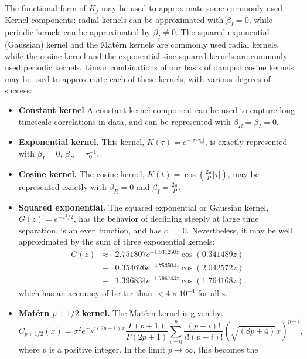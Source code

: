 \documentclass[manuscript, letterpaper]{aastex6}
\begin{document}
The functional form of $K_j$ may be used to approximate some commonly used Kernel components: radial
kernels can be approximated with $\beta_I=0$, while periodic kernels can be approximated by
$\beta_I \ne 0$.  The squared exponential (Gaussian) kernel and the Mat\'ern kernels are commonly
used radial kernels, while the cosine kernel and the exponential-sine-squared kernels are
commonly used periodic kernels.  Linear combinations of our basis of damped cosine kernels may be 
used to approximate each of these kernels, with various degrees of success:
\begin{itemize}
\item {\bf Constant kernel} A constant kernel component can be used to capture long-timescale
correlations in data, and can be represented with $\beta_R = \beta_I =  0$.
\item {\bf Exponential kernel.} This kernel, $K(\tau) = e^{-\vert \tau/\tau_0\vert}$, is exactly
represented with $\beta_I=0$, $\beta_R = \tau_0^{-1}$.
\item {\bf Cosine kernel.} The cosine kernel, $K(t) = \cos{\left(\frac{2\pi}{P} \vert \tau \vert\right)}$, 
may be represented exactly with $\beta_R=0$ and $\beta_I = \frac{2\pi}{P}$.
\item {\bf Squared exponential.} The squared exponential or Gaussian kernel, $G(z)=e^{-z^2/2}$,
has the behavior of declining steeply at large time separation, is an even function, and has $c_1$ = 0.
Nevertheless, it may be well approximated by the sum of three exponential kernels:
\begin{eqnarray}
G(z) &\approx& 2.751807 e^{-1.531250 z} \cos{(0.341489 z)} \\
 &-& 0.354626 e^{-4.753504 z} \cos{(2.042572 z)}\\
 &-& 1.396834 e^{-1.796743 z} \cos{(1.764168 z)},
\end{eqnarray}
which has an accuracy of better than $<4\times 10^{-4}$ for all z.
\item {\bf Mat\'ern $p+1/2$ kernel.}  The Mat\'ern kernel is given by:
\begin{equation}
C_{p+1/2}(x) = \sigma^2 e^{-\sqrt{(2p+1)}x} \frac{\Gamma(p+1)}{\Gamma(2p+1)}
\sum_{i=0}^p \frac{(p+i)!}{i!(p-i)!} (\sqrt{(8p+4)}x)^{p-i},
\end{equation} 
where $p$ is a positive integer.  In the limit $p\rightarrow \infty$, this becomes the

\end{itemize}
\end{document}
